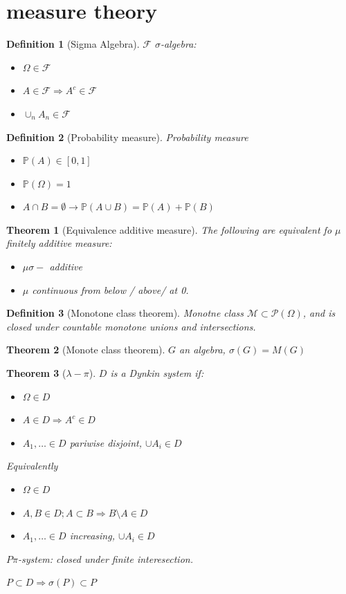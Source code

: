\documentclass{article}
\newtheorem{theorem}{Theorem}
\newtheorem{definition}{Definition}
\begin{document}
\section{measure theory}
  
\begin{definition}[Sigma Algebra]
  $\mathcal F$ $\sigma$-algebra:
  \begin{itemize}
  \item $\Omega \in \mathcal F$
  \item $A \in \mathcal F \Rightarrow A^c \in \mathcal F$
  \item $\cup_n A_n \in \mathcal F$
  \end{itemize}
\end{definition}
\begin{definition}[Probability measure]
  Probability measure
  \begin{itemize}
  \item $\mathbb P(A) \in [0, 1]$
  \item $\mathbb P(\Omega) = 1$
  \item $A \cap B = \emptyset \rightarrow \mathbb P(A \cup B) = \mathbb P(A) + \mathbb P(B)$
  \end{itemize}
\end{definition}
\begin{theorem}[Equivalence additive measure]
  The following are equivalent fo $\mu$ finitely additive measure:
  \begin{itemize}
  \item $\mu \sigma-$ additive
  \item $\mu$ continuous from below / above/ at 0.
  \end{itemize}
\end{theorem}
\begin{definition}[Monotone class theorem]
  Monotne class $\mathcal M \subset \mathcal P(\Omega)$,  and is closed under countable monotone unions and intersections.
\end{definition}
\begin{theorem}[Monote class theorem]
  $G$ an algebra, $\sigma(G) = M(G)$
\end{theorem}
\begin{theorem}[$\lambda-\pi$]
  $D$ is a Dynkin system if:
  \begin{itemize}
  \item $\Omega \in D$
  \item $A \in D \Rightarrow A^c \in D$ 
  \item $A_1, \ldots \in D$ pariwise disjoint, $\cup A_i \in D$
  \end{itemize}
  Equivalently
  \begin{itemize}
  \item $\Omega \in D$
  \item $A,B \in D ; A \subset B \Rightarrow B \setminus A \in D$ 
  \item $A_1, \ldots \in D$ increasing, $\cup A_i \in D$
  \end{itemize}

  $P \pi$-system: closed under finite interesection.

  $P \subset D \Rightarrow \sigma(P) \subset P$
\end{theorem}
\end{document}

